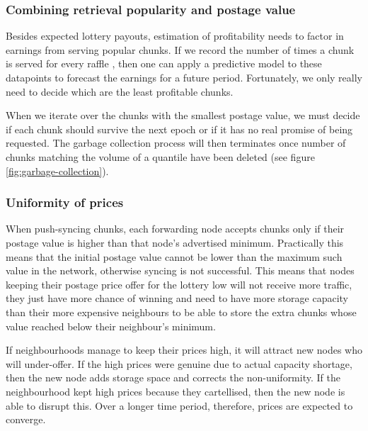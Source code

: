 \subsubsection{Combining retrieval popularity and postage value}

Besides expected lottery payouts, estimation of profitability needs to factor in earnings from serving popular chunks. If we record the number of times a chunk is served for every raffle , then one can apply a predictive model to these datapoints to forecast the earnings for a future period. Fortunately, we only really need to decide which are the least profitable chunks. 



When we iterate over the chunks with the smallest postage value, we must decide if each chunk should survive the next epoch or if it has no real promise of being requested. The garbage collection process will then terminates once number of chunks matching the volume of a quantile have been deleted (see figure \ref{fig:garbage-collection}).

\subsubsection{Uniformity of prices} 

When push-syncing chunks, each forwarding node accepts chunks only if their postage value is higher than that node's advertised minimum. Practically this means that the initial postage value cannot be lower than the maximum such value in the network, otherwise syncing is not successful. This means that nodes keeping their postage price offer for the lottery low will not receive more traffic, they just have more chance of winning and need to have more storage capacity than their more expensive neighbours to be able to store the extra chunks whose value reached below their neighbour's minimum.

If neighbourhoods manage to keep their prices high, it will attract new nodes who will under-offer. If the high prices were genuine due to actual capacity shortage, then the new node adds storage space and corrects the non-uniformity. If the neighbourhood kept high prices because they cartellised, then the new node is able to disrupt this. Over a longer time period, therefore, prices are expected to converge.



